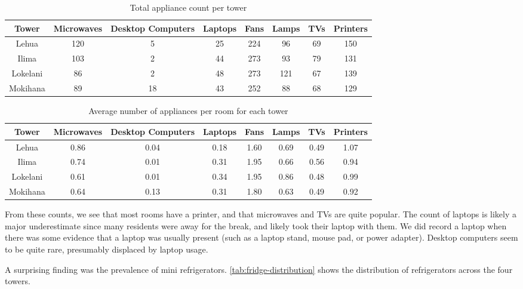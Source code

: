 \begin{table}[htbp]
	\centering
		\begin{tabular}{| c || c | c | c | c | c | c | c |}
			\hline
			Tower & Microwaves & Desktop Computers & Laptops & Fans & Lamps & TVs & Printers \tabularnewline \hline \hline
			
			Lehua & 120 & 5 & 25 & 224 & 96 & 69 & 150 \tabularnewline \hline

			Ilima & 103 & 2 & 44 & 273 & 93 & 79 & 131 \tabularnewline \hline

			Lokelani & 86 & 2 & 48 & 273 & 121 & 67 & 139 \tabularnewline \hline

			Mokihana & 89 & 18 & 43 & 252 & 88 & 68 & 129  \tabularnewline \hline

		\end{tabular}
	\caption{Total appliance count per tower}
\label{tab:appliance-count}
\end{table}

\begin{table}[htbp]
	\centering
		\begin{tabular}{| c || c | c | c | c | c | c | c |}
			\hline
			Tower & Microwaves & Desktop Computers & Laptops & Fans & Lamps & TVs & Printers \tabularnewline \hline \hline
			
			Lehua & 0.86 & 0.04 & 0.18 & 1.60 & 0.69 & 0.49 & 1.07 \tabularnewline \hline

			Ilima & 0.74 & 0.01 & 0.31 & 1.95 & 0.66 & 0.56 & 0.94 \tabularnewline \hline

			Lokelani & 0.61 & 0.01 & 0.34 & 1.95 & 0.86 & 0.48 & 0.99 \tabularnewline \hline

			Mokihana & 0.64 & 0.13 & 0.31 & 1.80 & 0.63 & 0.49 & 0.92 \tabularnewline \hline

		\end{tabular}
	\caption{Average number of appliances per room for each tower}
\label{tab:appliance-average}
\end{table}

From these counts, we see that most rooms have a printer, and that microwaves and TVs are quite popular. The count of laptops is likely a major underestimate since many residents were away for the break, and likely took their laptop with them. We did record a laptop when there was some evidence that a laptop was usually present (such as a laptop stand, mouse pad, or power adapter). Desktop computers seem to be quite rare, presumably displaced by laptop usage.

A surprising finding was the prevalence of mini refrigerators. \autoref{tab:fridge-distribution} shows the distribution of refrigerators across the four towers.

